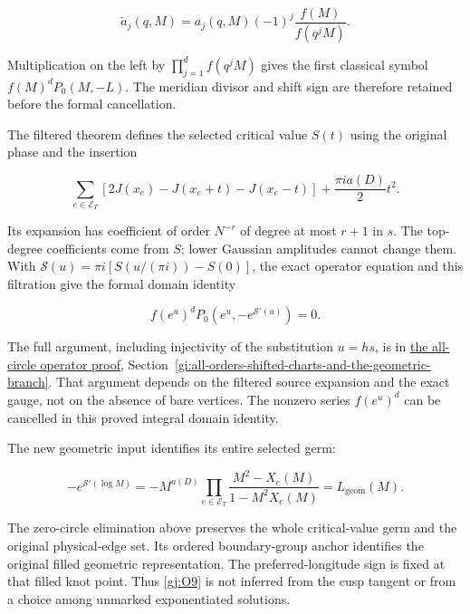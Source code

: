 \begin{equation}\label{gj:O6}
\widetilde a_j(q,M)
 =a_j(q,M)(-1)^j\frac{f(M)}{f(q^jM)}.
\end{equation}

Multiplication on the left by \(\prod_{j=1}^{d}f(q^jM)\)
gives the first classical symbol \(f(M)^dP_0(M,-L)\). The meridian
divisor and shift sign are therefore retained before the formal cancellation.

The filtered theorem defines the selected critical value \(S(t)\)
using the original phase and the insertion

\begin{equation}\label{gj:O7}
\sum_{e\in\mathcal E_T}
 [2J(x_e)-J(x_e+t)-J(x_e-t)]
 +\frac{\pi i a(D)}2t^2.
\end{equation}

Its expansion has coefficient of order \(N^{-r}\) of degree at
most \(r+1\) in \(s\). The top-degree coefficients come from \(S\);
lower Gaussian amplitudes cannot change them. With
\(\mathcal S(u)=\pi i[S(u/(\pi i))-S(0)]\), the exact operator
equation and this filtration give the formal domain identity

\begin{equation}\label{gj:O8}
f(e^u)^dP_0(e^u,-e^{\mathcal S'(u)})=0.
\end{equation}

The full argument, including injectivity of the substitution
\(u=hs\), is in
\href{https://sashakolpakov.github.io/murakamis_dream/notes/actual_all_circle_geometric_characteristic.html\#the-geometric-factor-of-an-actual-quantum-recurrence}{the all-circle operator proof},
Section~\ref{gi:all-orders-shifted-charts-and-the-geometric-branch}. That argument depends on the filtered source expansion
and the exact gauge, not on the absence of bare vertices. The
nonzero series \(f(e^u)^d\) can be cancelled in this proved integral
domain identity.

The new geometric input identifies its entire selected germ:

\begin{equation}\label{gj:O9}
-e^{\mathcal S'(\log M)}
 =-M^{a(D)}\prod_{e\in\mathcal E_T}
              \frac{M^2-X_e(M)}{1-M^2X_e(M)}
 =L_{\mathrm{geom}}(M).
\end{equation}

The zero-circle elimination above preserves the whole critical-value
germ and the original physical-edge set. Its ordered boundary-group
anchor identifies the original filled geometric representation.
The preferred-longitude sign is fixed at that filled knot point.
Thus \eqref{gj:O9} is not inferred from the cusp tangent or from a choice among
unmarked exponentiated solutions.

